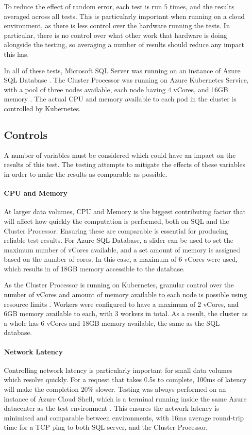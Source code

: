 To reduce the effect of random error, each test is run 5 times, and the results averaged across all tests. This is particularly important when running on a cloud environment, as there is less control over the hardware running the tests. In particular, there is no control over what other work that hardware is doing alongside the testing, so averaging a number of results should reduce any impact this has.

In all of these tests, Microsoft SQL Server was running on an instance of Azure SQL Database \cite{azuresqldatabase}. The Cluster Processor was running on Azure Kubernetes Service, with a pool of three nodes available, each node having 4 vCores, and 16GB memory \cite{azurekubernetesservice}. The actual CPU and memory available to each pod in the cluster is controlled by Kubernetes.

\subsection{Controls}
A number of variables must be considered which could have an impact on the results of this test. The testing attempts to mitigate the effects of these variables in order to make the results as comparable as possible.

\paragraph{CPU and Memory}
At larger data volumes, CPU and Memory is the biggest contributing factor that will affect how quickly the computation is performed, both on SQL and the Cluster Processor. Ensuring these are comparable is essential for producing reliable test results. For Azure SQL Database, a slider can be used to set the maximum number of vCores available, and a set amount of memory is assigned based on the number of cores. In this case, a maximum of 6 vCores were used, which results in of 18GB memory accessible to the database.

As the Cluster Processor is running on Kubernetes, granular control over the number of vCores and amount of memory available to each node is possible using resource limits \cite{k8sapi}. Workers were configured to have a maximum of 2 vCores, and 6GB memory available to each, with 3 workers in total. As a result, the cluster as a whole has 6 vCores and 18GB memory available, the same as the SQL database.

\paragraph{Network Latency}
Controlling network latency is particularly important for small data volumes which resolve quickly. For a request that takes 0.5s to complete, 100ms of latency will make the completion 20\% slower. Testing was always performed on an instance of Azure Cloud Shell, which is a terminal running inside the same Azure datacenter as the test environment \cite{azurecloudshell}. This ensures the network latency is minimised and comparable between environments, with 16ms average round-trip time for a TCP ping to both SQL server, and the Cluster Processor.

